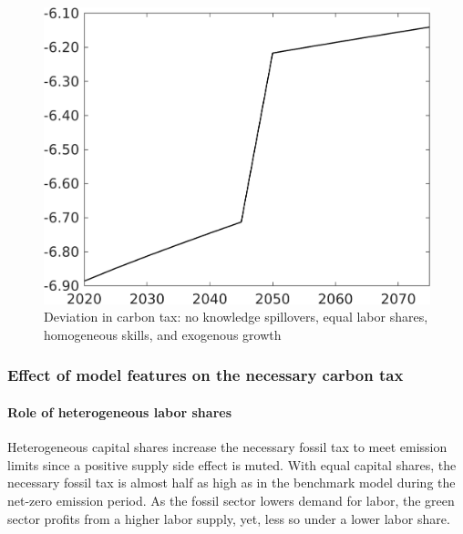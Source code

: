 \begin{figure}[h!!]
	\centering
	\caption{\footnotesize{ Deviation in carbon tax: no knowledge spillovers, equal labor shares, homogeneous skills, and exogenous growth}}\label{fig:zeromod_tauf}
	\begin{minipage}[]{0.32\textwidth}
		\centering
		\includegraphics[width=1\textwidth]{../../codding_model/own_basedOnFried/optimalPol_010922_revision/figures/all_13Sept22/CompTaufPER_bytaul_Equlab_Reg0_tauf_spillover0_nsk1_xgr1_knspil1_sep0_LFlimit1_emsbase0_countec0_GovRev0_etaa0.79_lgd0.png} \end{minipage}		
\end{figure} 


\subsubsection{Effect of model features on the necessary carbon tax}\label{app:eff_feat_exp}

\paragraph{Role of heterogeneous labor shares}
Heterogeneous capital shares increase the necessary fossil tax to meet emission limits since a positive supply side effect is muted. 
With equal capital shares, the necessary fossil tax is almost half as high as in the benchmark model during the net-zero emission period. 
As the fossil sector lowers demand for labor, the green sector profits from a higher labor supply, yet, less so under a lower labor share.  

